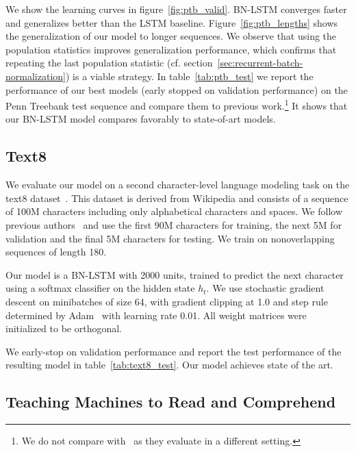 \documentclass{article} %
\begin{document}
We show the learning curves in figure~\ref{fig:ptb_valid}.
BN-LSTM converges faster and generalizes better than the LSTM baseline.
Figure~\ref{fig:ptb_lengths} shows the generalization of our model to longer sequences.
We observe that using the population statistics improves generalization performance,
which confirms that repeating the last population statistic (cf. section~\ref{sec:recurrent-batch-normalization})
is a viable strategy.
In table~\ref{tab:ptb_test} we report the performance of our best models (early stopped on validation performance)
on the Penn Treebank test sequence and compare them to previous work.\footnote{We do not compare with~\cite{graves2013generating} as they evaluate in a different setting.}
It shows that our BN-LSTM model compares favorably to state-of-art models.



\subsection{Text8}

We evaluate our model on a second character-level language modeling task on the text8 dataset~\cite{mahoney2009large}.
This dataset is derived from Wikipedia and consists of a sequence of 100M characters including only alphabetical characters and spaces.
We follow previous authors~\cite{mikolov2012subword,zhang2016architectural} and use the first 90M characters for training, the next 5M for validation and the final 5M characters for testing.
We train on nonoverlapping sequences of length 180.

Our model is a BN-LSTM with 2000 units, trained to predict the next character using a softmax classifier on the hidden state $h_t$.
We use stochastic gradient descent on minibatches of size 64,
with gradient clipping at 1.0 and step rule determined by Adam~\cite{kingma2014adam}
with learning rate 0.01.
All weight matrices were initialized to be orthogonal.

We early-stop on validation performance and report the test performance of the resulting model in table~\ref{tab:text8_test}.
Our model achieves state of the art.

\subsection{Teaching Machines to Read and Comprehend}
\end{document}
